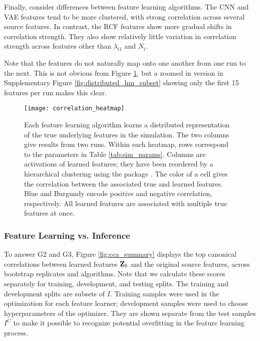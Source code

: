 Finally, consider differences between feature learning algorithms. The CNN and
VAE features tend to be more clustered, with strong correlation across several
source features. In contrast, the RCF features show more gradual shifts in
correlation strength. They also show relatively little variation in correlation
strength across features other than $\lambda_{i1}$ and $N_{i}$.

Note that the features do not naturally map onto one another from one run to the
next. This is not obvious from Figure \ref{fig:distributed_hm}, but a zoomed in
version in Supplementary Figure \ref{fig:distributed_hm_subset} showing only the
first 15 features per run makes this clear.

\begin{figure}
  \centering
  \texttt{[image: correlation\_heatmap]}
  \caption{Each feature learning algorithm learns a distributed
    representation of the true underlying features in the simulation. The two
    columns give results from two runs. Within each heatmap, rows correspond to
    the parameters in Table \ref{tab:sim_params}. Columns are activations of
    learned features; they have been reordered by a hierarchical clustering
    using the package \citep{barter2018superheat}. The color of a cell gives the
    correlation between the associated true and learned features. Blue and
    Burgundy encode positive and negative correlation, respectively. All learned
    features are associated with multiple true features at once.}
  \label{fig:distributed_hm}
\end{figure}

\subsubsection{Feature Learning vs. Inference}

To answer G2 and G3, Figure \ref{fig:cca_summary} displays the top canonical
correlations between learned features $\underaccent{\bar}{\mathbf{Z}}_{b}$ and
the original source features, across bootstrap replicates and algorithms. Note
that we calculate these scores separately for training, development, and testing
splits. The training and development splits are subsets of $I$. Training samples
were used in the optimization for each feature learner; development samples were
used to choose hyperparameters of the optimizer. They are shown separate from
the test samples $I^{C}$ to make it possible to recognize potential overfitting
in the feature learning process.


